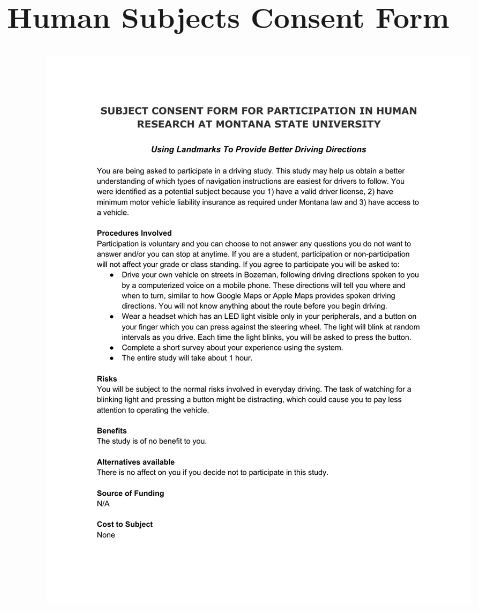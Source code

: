 \chapter{Human Subjects Consent Form}\label{append:consent}

\begin{figure}[htop]
 \centering 
 \includegraphics[page=1, width=\textwidth]{images/consent_form.pdf}
\end{figure}

